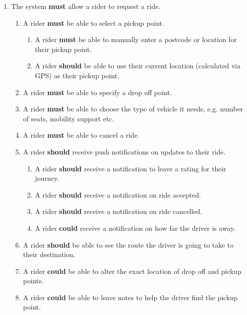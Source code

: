 \documentclass{article}
\begin{document}
    \begin{enumerate}
      \item The system \textbf{must} allow a rider to request a ride.
      \begin{enumerate}[label=1.\arabic{*}]
        \item A rider \textbf{must} be able to select a pickup point.
        \begin{enumerate}[label=1.1.\arabic{*}]
          \item A rider \textbf{must} be able to manually enter a postcode or location for their pickup point.
          \item A rider \textbf{should} be able to use their current location (calculated via GPS) as their pickup point.
        \end{enumerate}
        \item A rider \textbf{must} be able to specify a drop off point.
        \item A rider \textbf{must} be able to choose the type of vehicle it needs, e.g. number of seats, mobility support etc.
        \item A rider \textbf{must} be able to cancel a ride.
        \item A rider \textbf{should} receive push notifications on updates to their ride.
        \begin{enumerate}[label=1.5.\arabic{*}]
          \item A rider \textbf{should} receive a notification to leave a rating for their journey.
          \item A rider \textbf{should} receive a notification on ride accepted.
          \item A rider \textbf{should} receive a notification on ride cancelled.
          \item A rider \textbf{could} receive a notification on how far the driver is away.
        \end{enumerate}
        \item A rider \textbf{should} be able to see the route the driver is going to take to their destination.
        \item A rider \textbf{could} be able to alter the exact location of drop off and pickup points.
        \item A rider \textbf{could} be able to leave notes to help the driver find the pickup point.
      \end{enumerate}


\end{enumerate}
\end{document}
